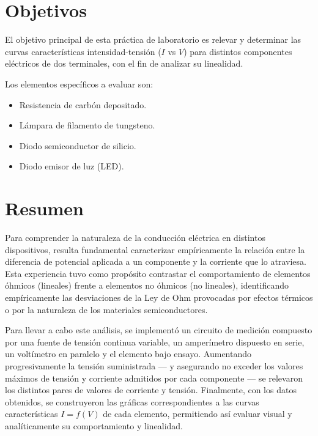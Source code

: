 \section{Objetivos}
El objetivo principal de esta práctica de laboratorio es relevar y determinar las curvas características intensidad-tensión ($I$ vs $V$) para distintos componentes eléctricos de dos terminales, con el fin de analizar su linealidad.

Los elementos específicos a evaluar son:
\begin{itemize}
    \item Resistencia de carbón depositado.
    \item Lámpara de filamento de tungsteno.
    \item Diodo semiconductor de silicio.
    \item Diodo emisor de luz (LED).
\end{itemize}

\vspace{0.5cm}

\section{Resumen}
Para comprender la naturaleza de la conducción eléctrica en distintos dispositivos, resulta fundamental caracterizar empíricamente la relación entre la diferencia de potencial aplicada a un componente y la corriente que lo atraviesa. Esta experiencia tuvo como propósito contrastar el comportamiento de elementos óhmicos (lineales) frente a elementos no óhmicos (no lineales), identificando empíricamente las desviaciones de la Ley de Ohm provocadas por efectos térmicos o por la naturaleza de los materiales semiconductores.

Para llevar a cabo este análisis, se implementó un circuito de medición compuesto por una fuente de tensión continua variable, un amperímetro dispuesto en serie, un voltímetro en paralelo y el elemento bajo ensayo. Aumentando progresivamente la tensión suministrada — y asegurando no exceder los valores máximos de tensión y corriente admitidos por cada componente — se relevaron los distintos pares de valores de corriente y tensión. Finalmente, con los datos obtenidos, se construyeron las gráficas correspondientes a las curvas características $I=f(V)$ de cada elemento, permitiendo así evaluar visual y analíticamente su comportamiento y linealidad.

\vspace{0.8cm}
